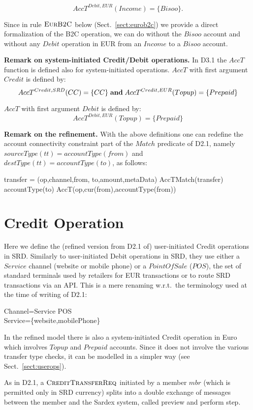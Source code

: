\[AccT^{Debit,EUR}(Income) =\{Bisoo\}.\] 

Since in rule $\hbox{\sc EurB2C}$ below (Sect.~\ref{sect:eurob2c}) we provide a direct formalization of the B2C operation, we can do without the $Bisoo$ account and without any $Debit$ operation in EUR from an $Income$ to a $Bisoo$ account.

{\bf Remark on system-initiated Credit/Debit operations.} In D3.1 the $AccT$ function is defined also for system-initiated operations. $AccT$ with first argument $Credit$ is defined by:
\[AccT^{Credit,SRD}(CC)=\{CC\} \mathrel{\mathbf{and}} AccT^{Credit,EUR}(Topup)=\{Prepaid\} \]

$AccT$ with first argument $Debit$ is defined by:
\[AccT^{Debit,EUR}(Topup)=\{Prepaid\}\]

{\bf Remark on the refinement.} With the above definitions one can redefine the account connectivity constraint part of the $Match$ predicate of D2.1, namely $sourceType(tt)=accountType(from)$ and $destType(tt)=accountType(to)$, as follows:

\begin{asm}
\LET transfer = (op,channel,from, to,amount,metaData) \+
AccTMatch(transfer) \IFF ~~   accountType(to) \in AccT(op,cur(from),accountType(from))
\end{asm}

\section{Credit Operation} 
\label{sect:creditops}

Here we define the (refined version from D2.1 of) user-initiated Credit operations in SRD. Similarly to user-initiated Debit operations in SRD, they use either a $Service$ channel (website or mobile phone) or a $PointOfSale$ ($POS$), the set of standard terminals used by retailers for EUR transactions or to route SRD transactions via an API. This is a mere renaming w.r.t.\ the terminology used at the time of writing of D2.1:
\begin{asm}
Channel=Service \cup POS \\
Service=\{website,mobilePhone\}
\end{asm}

In the refined model there is also a system-initiated Credit operation in Euro which involves $Topup$ and $Prepaid$ accounts. Since it does not involve the various transfer type checks, it can be modelled in a simpler way (see Sect.~\ref{sect:userops}).

As in D2.1, a $\hbox{\sc CreditTransferReq}$ initiated by a member $mbr$ (which is permitted only in SRD currency) splits into a double exchange of messages between the member and the Sardex system, called preview and perform step.

